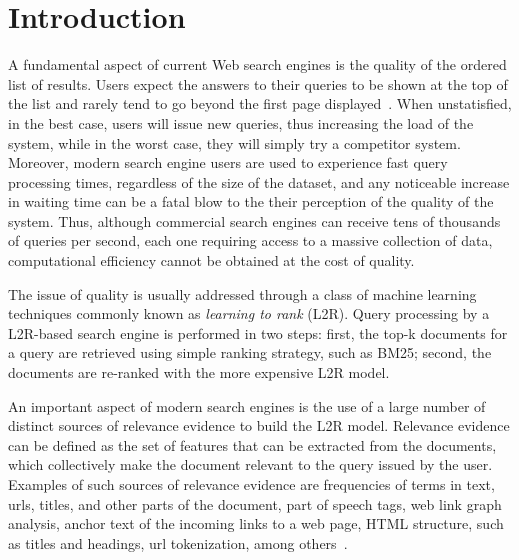 \documentclass[preprint,12pt,3p]{elsarticle}
\begin{document}


\section{Introduction}
\label{intro}

A fundamental aspect of current Web search engines is the quality of the ordered list of results. Users expect the answers to their queries to be shown at the top of the list and rarely tend to go beyond the first page displayed~\cite{saraiva2001rank}. When unstatisfied, in the best case, users will issue new queries, thus increasing the load of the system, while in the worst case, they will simply try a competitor system. Moreover, modern search engine users are used to experience fast query processing times, regardless of the size of the dataset, and any noticeable increase in waiting time can be a fatal blow to the their perception of the quality of the system. Thus, although commercial search engines can receive tens of thousands of queries per second, each one requiring access to a massive collection of data, computational efficiency cannot be obtained at the cost of quality. 

The issue of quality is usually addressed through a class of machine learning techniques commonly known as \textit{learning to rank} (L2R). Query processing by a L2R-based search engine is performed in two steps: first, the top-k documents for a query are retrieved using simple ranking strategy, such as BM25; second, the documents are re-ranked with the more expensive L2R model.

An important aspect of modern search engines is the use of a large number of distinct sources of relevance evidence to build the L2R model. Relevance evidence can be defined as the set of features that can be extracted from the documents, which collectively make the document relevant to the query issued by the user. Examples of such sources of relevance evidence are frequencies of terms in text, urls, titles, and other parts of the document, part of speech tags, web link graph analysis, anchor text of the incoming links to a web page, HTML structure, such as titles and headings, url tokenization, among others~\cite{baezaribeiro2011modinforet}. 
\end{document}
